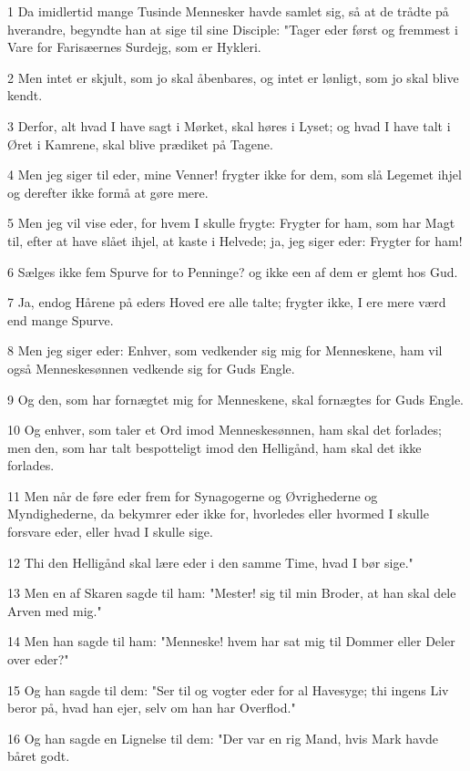 \par 1 Da imidlertid mange Tusinde Mennesker havde samlet sig, så at de trådte på hverandre, begyndte han at sige til sine Disciple: "Tager eder først og fremmest i Vare for Farisæernes Surdejg, som er Hykleri.
\par 2 Men intet er skjult, som jo skal åbenbares, og intet er lønligt, som jo skal blive kendt.
\par 3 Derfor, alt hvad I have sagt i Mørket, skal høres i Lyset; og hvad I have talt i Øret i Kamrene, skal blive prædiket på Tagene.
\par 4 Men jeg siger til eder, mine Venner! frygter ikke for dem, som slå Legemet ihjel og derefter ikke formå at gøre mere.
\par 5 Men jeg vil vise eder, for hvem I skulle frygte: Frygter for ham, som har Magt til, efter at have slået ihjel, at kaste i Helvede; ja, jeg siger eder: Frygter for ham!
\par 6 Sælges ikke fem Spurve for to Penninge? og ikke een af dem er glemt hos Gud.
\par 7 Ja, endog Hårene på eders Hoved ere alle talte; frygter ikke, I ere mere værd end mange Spurve.
\par 8 Men jeg siger eder: Enhver, som vedkender sig mig for Menneskene, ham vil også Menneskesønnen vedkende sig for Guds Engle.
\par 9 Og den, som har fornægtet mig for Menneskene, skal fornægtes for Guds Engle.
\par 10 Og enhver, som taler et Ord imod Menneskesønnen, ham skal det forlades; men den, som har talt bespotteligt imod den Helligånd, ham skal det ikke forlades.
\par 11 Men når de føre eder frem for Synagogerne og Øvrighederne og Myndighederne, da bekymrer eder ikke for, hvorledes eller hvormed I skulle forsvare eder, eller hvad I skulle sige.
\par 12 Thi den Helligånd skal lære eder i den samme Time, hvad I bør sige."
\par 13 Men en af Skaren sagde til ham: "Mester! sig til min Broder, at han skal dele Arven med mig."
\par 14 Men han sagde til ham: "Menneske! hvem har sat mig til Dommer eller Deler over eder?"
\par 15 Og han sagde til dem: "Ser til og vogter eder for al Havesyge; thi ingens Liv beror på, hvad han ejer, selv om han har Overflod."
\par 16 Og han sagde en Lignelse til dem: "Der var en rig Mand, hvis Mark havde båret godt.
